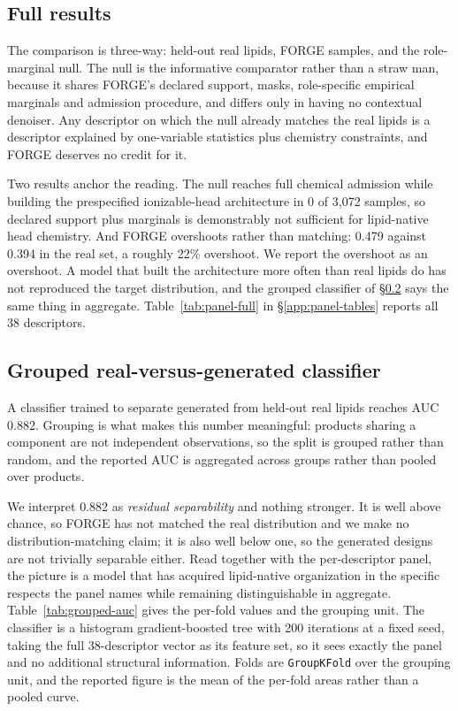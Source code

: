 \documentclass{article}
\newcommand{\WantedHeadReal}{0.394}
\newcommand{\WantedHeadForge}{0.479}
\newcommand{\GroupedAUC}{0.882}
\newcommand{\NullHeadRate}{0}                 %
\newcommand{\NullDraws}{3{,}072}
\newcommand{\PanelSize}{38}                   %
\begin{document}
\subsection{Full results}
\label{app:panel-results}
The comparison is three-way: held-out real lipids, FORGE samples, and the role-marginal null. The
null is the informative comparator rather than a straw man, because it shares FORGE's declared
support, masks, role-specific empirical marginals and admission procedure, and differs only in having
no contextual denoiser. Any descriptor on which the null already matches the real lipids is a
descriptor explained by one-variable statistics plus chemistry constraints, and FORGE deserves no
credit for it.

Two results anchor the reading. The null reaches full chemical admission while building the
prespecified ionizable-head architecture in \NullHeadRate{} of \NullDraws{} samples, so declared
support plus marginals is demonstrably not sufficient for lipid-native head chemistry. And FORGE
overshoots rather than matching: \WantedHeadForge{} against \WantedHeadReal{} in the real set, a
roughly 22\% overshoot. We report the overshoot as an overshoot. A model that built the architecture
more often than real lipids do has not reproduced the target distribution, and the grouped classifier
of \S\ref{app:grouped-auc} says the same thing in aggregate.
Table~\ref{tab:panel-full} in \S\ref{app:panel-tables} reports all \PanelSize{} descriptors.

\subsection{Grouped real-versus-generated classifier}
\label{app:grouped-auc}
A classifier trained to separate generated from held-out real lipids reaches AUC \GroupedAUC{}.
Grouping is what makes this number meaningful: products sharing a component are not independent
observations, so the split is grouped rather than random, and the reported AUC is aggregated across
groups rather than pooled over products.

We interpret \GroupedAUC{} as \emph{residual separability} and nothing stronger. It is well above
chance, so FORGE has not matched the real distribution and we make no distribution-matching claim; it
is also well below one, so the generated designs are not trivially separable either. Read together
with the per-descriptor panel, the picture is a model that has acquired lipid-native organization in
the specific respects the panel names while remaining distinguishable in aggregate.
Table~\ref{tab:grouped-auc} gives the per-fold values and the grouping unit.
The classifier is a histogram gradient-boosted tree with 200 iterations at a fixed seed, taking the full \PanelSize{}-descriptor vector as its feature set, so it sees exactly the panel and no additional structural information. Folds are \texttt{GroupKFold} over the grouping unit, and the reported figure is the mean of the per-fold areas rather than a pooled curve.
\end{document}
